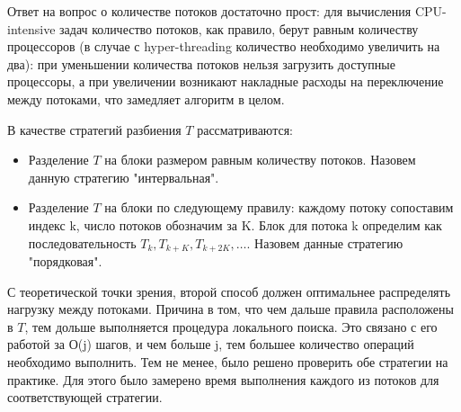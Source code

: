 \documentclass[14pt]{article}
\begin{document}
Ответ на вопрос о количестве потоков достаточно прост: для вычисления CPU-intensive задач количество потоков, как правило, берут равным количеству процессоров (в случае с hyper-threading количество необходимо увеличить на два): при уменьшении количества потоков нельзя загрузить доступные процессоры, а при увеличении возникают накладные расходы на переключение между потоками, что замедляет алгоритм в целом.

В качестве стратегий разбиения $T$ рассматриваются:
\begin{itemize}
\item Разделение $T$ на блоки размером равным количеству потоков. Назовем данную стратегию "интервальная".
\item Разделение $T$ на блоки по следующему правилу: каждому потоку сопоставим индекс k, число потоков обозначим за K. Блок для потока k определим как последовательность $T_k, T_{k + K}, T_{k + 2K}, \dotsc$. Назовем данные стратегию "порядковая".
\end{itemize}

С теоретической точки зрения, второй способ должен оптимальнее распределять нагрузку между потоками. Причина в том, что чем дальше правила расположены в $T$, тем дольше выполняется процедура локального поиска. Это связано с его работой за О(j) шагов, и чем больше j, тем большее количество операций необходимо выполнить. Тем не менее, было решено проверить обе стратегии на практике. Для этого было замерено время выполнения каждого из потоков для соответствующей стратегии.
\end{document}
